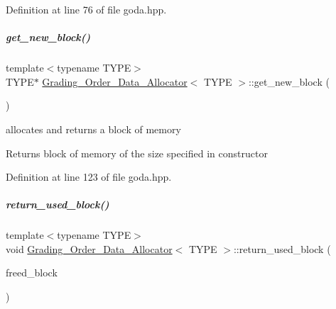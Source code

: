 Definition at line 76 of file goda.\+hpp.

\mbox{\label{group__memorygroup_a699e85282a021fd7b06f65b9e773eb30}} 
\subparagraph{\texorpdfstring{get\+\_\+new\+\_\+block()}{get\_new\_block()}}
{\footnotesize\ttfamily template$<$typename T\+Y\+PE$>$ \\
T\+Y\+PE$\ast$ \hyperlink{group__memorygroup_class_grading___order___data___allocator}{Grading\+\_\+\+Order\+\_\+\+Data\+\_\+\+Allocator}$<$ T\+Y\+PE $>$\+::get\+\_\+new\+\_\+block (\begin{DoxyParamCaption}{ }\end{DoxyParamCaption})\hspace{0.3cm}{\ttfamily [inline]}}



allocates and returns a block of memory 

\begin{DoxyReturn}{Returns}
block of memory of the size specified in constructor 
\end{DoxyReturn}


Definition at line 123 of file goda.\+hpp.

\mbox{\label{group__memorygroup_a518a8f61da93ea93651f426e12761a07}} 
\subparagraph{\texorpdfstring{return\+\_\+used\+\_\+block()}{return\_used\_block()}}
{\footnotesize\ttfamily template$<$typename T\+Y\+PE$>$ \\
void \hyperlink{group__memorygroup_class_grading___order___data___allocator}{Grading\+\_\+\+Order\+\_\+\+Data\+\_\+\+Allocator}$<$ T\+Y\+PE $>$\+::return\+\_\+used\+\_\+block (\begin{DoxyParamCaption}\item[{T\+Y\+PE $\ast$}]{freed\+\_\+block }\end{DoxyParamCaption})\hspace{0.3cm}{\ttfamily [inline]}}




